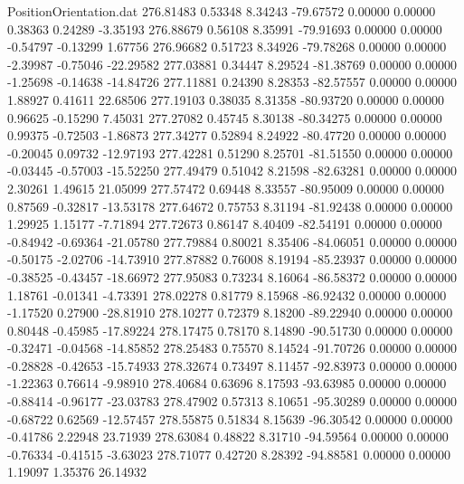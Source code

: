 \begin{filecontents}{PositionOrientation.dat}
 276.81483    0.53348    8.34243   -79.67572    0.00000    0.00000    0.38363    0.24289   -3.35193
 276.88679    0.56108    8.35991   -79.91693    0.00000    0.00000   -0.54797   -0.13299    1.67756
 276.96682    0.51723    8.34926   -79.78268    0.00000    0.00000   -2.39987   -0.75046  -22.29582
 277.03881    0.34447    8.29524   -81.38769    0.00000    0.00000   -1.25698   -0.14638  -14.84726
 277.11881    0.24390    8.28353   -82.57557    0.00000    0.00000    1.88927    0.41611   22.68506
 277.19103    0.38035    8.31358   -80.93720    0.00000    0.00000    0.96625   -0.15290    7.45031
 277.27082    0.45745    8.30138   -80.34275    0.00000    0.00000    0.99375   -0.72503   -1.86873
 277.34277    0.52894    8.24922   -80.47720    0.00000    0.00000   -0.20045    0.09732  -12.97193
 277.42281    0.51290    8.25701   -81.51550    0.00000    0.00000   -0.03445   -0.57003  -15.52250
 277.49479    0.51042    8.21598   -82.63281    0.00000    0.00000    2.30261    1.49615   21.05099
 277.57472    0.69448    8.33557   -80.95009    0.00000    0.00000    0.87569   -0.32817  -13.53178
 277.64672    0.75753    8.31194   -81.92438    0.00000    0.00000    1.29925    1.15177   -7.71894
 277.72673    0.86147    8.40409   -82.54191    0.00000    0.00000   -0.84942   -0.69364  -21.05780
 277.79884    0.80021    8.35406   -84.06051    0.00000    0.00000   -0.50175   -2.02706  -14.73910
 277.87882    0.76008    8.19194   -85.23937    0.00000    0.00000   -0.38525   -0.43457  -18.66972
 277.95083    0.73234    8.16064   -86.58372    0.00000    0.00000    1.18761   -0.01341   -4.73391
 278.02278    0.81779    8.15968   -86.92432    0.00000    0.00000   -1.17520    0.27900  -28.81910
 278.10277    0.72379    8.18200   -89.22940    0.00000    0.00000    0.80448   -0.45985  -17.89224
 278.17475    0.78170    8.14890   -90.51730    0.00000    0.00000   -0.32471   -0.04568  -14.85852
 278.25483    0.75570    8.14524   -91.70726    0.00000    0.00000   -0.28828   -0.42653  -15.74933
 278.32674    0.73497    8.11457   -92.83973    0.00000    0.00000   -1.22363    0.76614   -9.98910
 278.40684    0.63696    8.17593   -93.63985    0.00000    0.00000   -0.88414   -0.96177  -23.03783
 278.47902    0.57313    8.10651   -95.30289    0.00000    0.00000   -0.68722    0.62569  -12.57457
 278.55875    0.51834    8.15639   -96.30542    0.00000    0.00000   -0.41786    2.22948   23.71939
 278.63084    0.48822    8.31710   -94.59564    0.00000    0.00000   -0.76334   -0.41515   -3.63023
 278.71077    0.42720    8.28392   -94.88581    0.00000    0.00000    1.19097    1.35376   26.14932

\end{filecontents}
